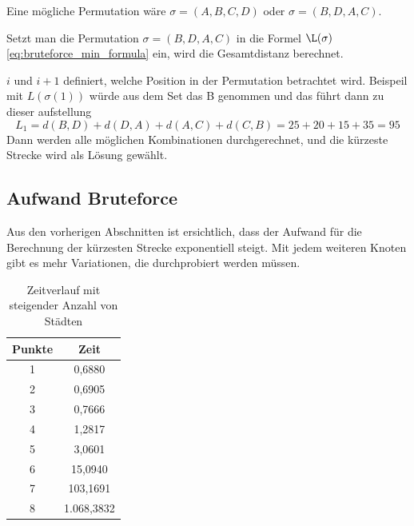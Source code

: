 Eine mögliche Permutation wäre $\sigma = (A, B, C, D)$ oder $\sigma = (B, D, A, C)$.

Setzt man die Permutation $\sigma = (B, D, A, C)$ in die Formel $\L(\sigma)$
\ref{eq:bruteforce_min_formula} ein, wird die Gesamtdistanz berechnet.


\(i\) und \(i+1\) definiert, welche Position in der Permutation betrachtet wird. 
Beispeil mit \( L(\sigma(1)) \) würde aus dem Set das B genommen und das führt 
dann zu dieser aufstellung
\begin{equation}
    \label{eq:bruteforce_min_formula}
    L_1 = d(B, D) + d(D, A) + d(A, C) + d(C, B)
    = 25 + 20 + 15 + 35 = 95
\end{equation}
Dann werden alle möglichen Kombinationen durchgerechnet, und die kürzeste 
Strecke wird als Lösung gewählt.

\subsection{Aufwand Bruteforce
    \label{variationsprinzip_algorithmen:section:bruteforce}}
Aus den vorherigen Abschnitten ist ersichtlich, dass der Aufwand für die 
Berechnung der kürzesten Strecke exponentiell steigt. Mit jedem weiteren 
Knoten gibt es mehr Variationen, die durchprobiert werden müssen. 

\begin{table}[ht]
    \centering
    \caption{Zeitverlauf mit steigender Anzahl von Städten}
    \begin{tabular}{cc}
        \toprule
        Punkte & Zeit       \\
        \midrule
        1      & 0,6880     \\
        2      & 0,6905     \\
        3      & 0,7666     \\
        4      & 1,2817     \\
        5      & 3,0601     \\
        6      & 15,0940    \\
        7      & 103,1691   \\
        8      & 1.068,3832 \\
        \bottomrule
    \end{tabular}
\end{table}

